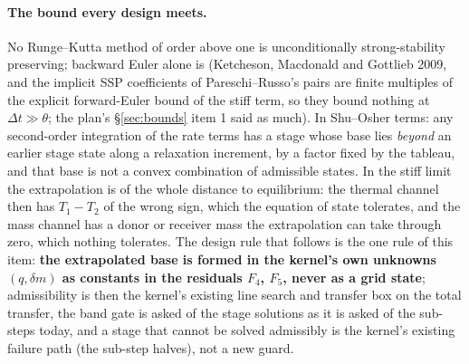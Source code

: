 \documentclass[11pt,a4paper]{article}
\newcommand{\Dt}{\Delta t}
\begin{document}
\paragraph{The bound every design meets.}  No Runge--Kutta method of
order above one is unconditionally strong-stability preserving;
backward Euler alone is (Ketcheson, Macdonald and Gottlieb 2009, and
the implicit SSP coefficients of Pareschi--Russo's pairs are finite
multiples of the explicit forward-Euler bound of the stiff term, so
they bound nothing at $\Dt \gg \theta$; the plan's \S\ref{sec:bounds}
item 1 said as much).  In Shu--Osher terms: any second-order
integration of the rate terms has a stage whose base lies
\emph{beyond} an earlier stage state along a relaxation increment, by a
factor fixed by the tableau, and that base is not a convex combination
of admissible states.  In the stiff limit the extrapolation is of the
whole distance to equilibrium: the thermal channel then has $T_1 - T_2$
of the wrong sign, which the equation of state tolerates, and the mass
channel has a donor or receiver mass the extrapolation can take through
zero, which nothing tolerates.  The design rule that follows is the one
rule of this item: \textbf{the extrapolated base is formed in the
kernel's own unknowns $(q, \delta m)$ as constants in the residuals
$F_4$, $F_5$, never as a grid state}; admissibility is then the
kernel's existing line search and transfer box on the total transfer,
the band gate is asked of the stage solutions as it is asked of the
sub-steps today, and a stage that cannot be solved admissibly is the
kernel's existing failure path (the sub-step halves), not a new guard.
\end{document}
